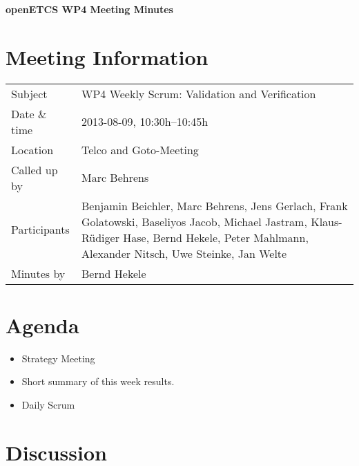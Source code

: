 \documentclass[a4paper, 11pt]{article}
\begin{document}
{\begin{center}\huge\bf openETCS WP4 Meeting Minutes\end{center}}
\section{Meeting Information}

\renewcommand{\arraystretch}{1.5}
\begin{supertabular}{m{.2\textwidth}m{.8\textwidth}}
Subject & WP4 Weekly Scrum: Validation and Verification\\
Date \& time & 2013-08-09, 10:30h--10:45h\\
Location & Telco and Goto-Meeting\\
Called up by & Marc Behrens\\
Participants &
Benjamin Beichler,
Marc Behrens,
Jens Gerlach,
Frank Golatowski,
Baseliyos Jacob,
Michael Jastram,
Klaus-R\"udiger Hase,
Bernd Hekele,
Peter Mahlmann,
Alexander Nitsch,
Uwe Steinke,
Jan Welte
\\

Minutes by & Bernd Hekele\\

\end{supertabular}
\renewcommand{\arraystretch}{1.0}


\section{{Agenda}}
\begin{itemize}
\item Strategy Meeting
\item Short summary of this week results.
\item Daily Scrum
\end{itemize}

\section{Discussion}
\end{document}
